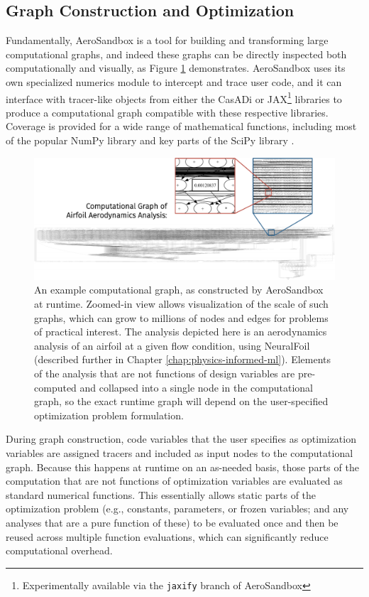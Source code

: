 \subsection{Graph Construction and Optimization}

Fundamentally, AeroSandbox is a tool for building and transforming large computational graphs, and indeed these graphs can be directly inspected both computationally and visually, as Figure \ref{fig:computational-graph-aerosandbox} demonstrates. AeroSandbox uses its own specialized numerics module to intercept and trace user code, and it can interface with tracer-like objects from either the CasADi \cite{casadi} or JAX\footnote{Experimentally available via the \texttt{jaxify} branch of AeroSandbox} \cite{jax} libraries to produce a computational graph compatible with these respective libraries. Coverage is provided for a wide range of mathematical functions, including most of the popular NumPy library \cite{harris_array_2020} and key parts of the SciPy library \cite{scipy}.

\begin{figure}[h]
    \centering
    \includegraphics[width=\textwidth]{../figures/large_computational_graph-crop.pdf} %
    \caption{An example computational graph, as constructed by AeroSandbox at runtime. Zoomed-in view allows visualization of the scale of such graphs, which can grow to millions of nodes and edges for problems of practical interest. The analysis depicted here is an aerodynamics analysis of an airfoil at a given flow condition, using NeuralFoil (described further in Chapter \ref{chap:physics-informed-ml}). Elements of the analysis that are not functions of design variables are pre-computed and collapsed into a single node in the computational graph, so the exact runtime graph will depend on the user-specified optimization problem formulation.}
    \label{fig:computational-graph-aerosandbox}
\end{figure}

During graph construction, code variables that the user specifies as optimization variables are assigned tracers and included as input nodes to the computational graph. Because this happens at runtime on an as-needed basis, those parts of the computation that are not functions of optimization variables are evaluated as standard numerical functions. This essentially allows static parts of the optimization problem (e.g., constants, parameters, or frozen variables; and any analyses that are a pure function of these) to be evaluated once and then be reused across multiple function evaluations, which can significantly reduce computational overhead.

